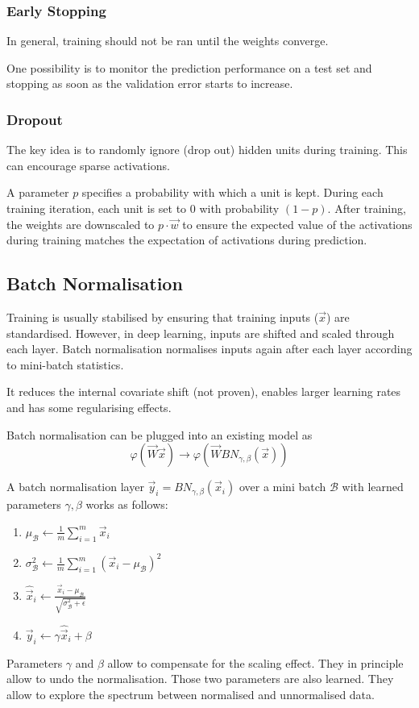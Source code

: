\subsubsection{Early Stopping}
In general, training should not be ran until the weights converge.

One possibility is to monitor the prediction performance
on a test set and stopping as soon as the validation
error starts to increase.

\subsubsection{Dropout}
The key idea is to randomly ignore (drop out) hidden units
during training.
This can encourage sparse activations.

A parameter $p$ specifies a probability with which a unit
is kept.
During each training iteration, each unit is set to $0$
with probability $(1 - p)$.
After training, the weights are downscaled to
$p \cdot \vec{w}$ to ensure the expected
value of the activations during training matches
the expectation of activations during prediction.


\subsection{Batch Normalisation}
Training is usually stabilised by ensuring that
training inputs ($\vec{x}$) are standardised.
However, in deep learning, inputs are shifted and scaled
through each layer.
Batch normalisation normalises inputs again after each layer
according to mini-batch statistics.

It reduces the internal covariate shift (not proven),
enables larger learning rates and has some regularising effects.

Batch normalisation can be plugged into an existing model as
\begin{equation*}
\varphi(\vec{W} \vec{x}) \longrightarrow
\varphi(\vec{W} BN_{\gamma, \beta}(\vec{x}))
\end{equation*}

A batch normalisation layer
$\vec{y}_i = BN_{\gamma, \beta}(\vec{x}_i)$
over a mini batch
$\mathcal{B}$ with learned parameters $\gamma, \beta$
works as follows:
\begin{enumerate}
	\item $\mu_\mathcal{B} \gets \frac{1}{m} \sum_{i=1}^m{\vec{x}_i}$
	\item $\sigma_\mathcal{B}^2 \gets \frac{1}{m} \sum_{i=1}^m{(\vec{x}_i - \mu_\mathcal{B})^2}$
	\item $\hat{\vec{x}}_i \gets \frac{\vec{x}_i - \mu_\mathcal{B}}{\sqrt{\sigma_\mathcal{B}^2 + \epsilon}}$
	\item $\vec{y}_i \gets \gamma \hat{\vec{x}}_i + \beta$
\end{enumerate}
Parameters $\gamma$ and $\beta$ allow to compensate
for the scaling effect.
They in principle allow to undo the normalisation.
Those two parameters are also learned.
They allow to explore the spectrum between normalised
and unnormalised data.


